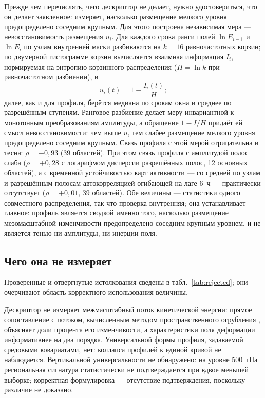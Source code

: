 \documentclass[11pt,a4paper]{article}
\begin{document}
Прежде чем перечислять, чего дескриптор не делает, нужно удостовериться, что он делает заявленное: измеряет, насколько размещение мелкого уровня предопределено соседним крупным. Для этого построена независимая мера --- невосстановимость размещения $u_i$. Для каждого срока ранги полей $\ln E_{i-1}$ и $\ln E_i$ по узлам внутренней маски разбиваются на $k=16$ равночастотных корзин; по двумерной гистограмме корзин вычисляется взаимная информация $I_i$, нормируемая на энтропию корзинного распределения ($H=\ln k$ при равночастотном разбиении), и
\begin{equation}
\label{eq:u}
u_i(t)=1-\frac{I_i(t)}{H};
\end{equation}
далее, как и для профиля, берётся медиана по срокам окна и среднее по разрешённым ступеням. Ранговое разбиение делает меру инвариантной к монотонным преобразованиям амплитуды, а обращение $1-I/H$ придаёт ей смысл невосстановимости: чем выше $u$, тем слабее размещение мелкого уровня предопределено соседним крупным. Связь профиля с этой мерой отрицательна и тесна: $\rho=-0{,}93$ (39 областей). При этом связь профиля с амплитудой полос слаба ($\rho=+0{,}28$ с логарифмом дисперсии разрешённых полос, 12 основных областей), а с временн\'{о}й устойчивостью карт активности --- со средней по узлам и разрешённым полосам автокорреляцией огибающей на лаге 6~ч --- практически отсутствует ($\rho=+0{,}01$, 39 областей). Обе величины --- статистики одного совместного распределения, так что проверка внутренняя; она устанавливает главное: профиль является сводкой именно того, насколько размещение мезомасштабной изменчивости предопределено соседним крупным уровнем, и не является тенью ни амплитуды, ни инерции поля.

\subsection{Чего она не измеряет}

Проверенные и отвергнутые истолкования сведены в табл.~\ref{tab:rejected}; они очерчивают область корректного использования величины.

Дескриптор не измеряет межмасштабный поток кинетической энергии: прямое сопоставление с потоком, вычисленным методом пространственного огрубления \cite{Germano1992,Aluie2018}, объясняет доли процента его изменчивости, а характеристики поля деформации информативнее на два порядка. Универсальной формы профиля, задаваемой средовыми ковариатами, нет: коллапса профилей к единой кривой не наблюдается. Вертикальной универсальности не обнаружено: на уровне 500~гПа региональная сигнатура статистически не подтверждается при вдвое меньшей выборке; корректная формулировка --- отсутствие подтверждения, поскольку различие не доказано.
\end{document}
